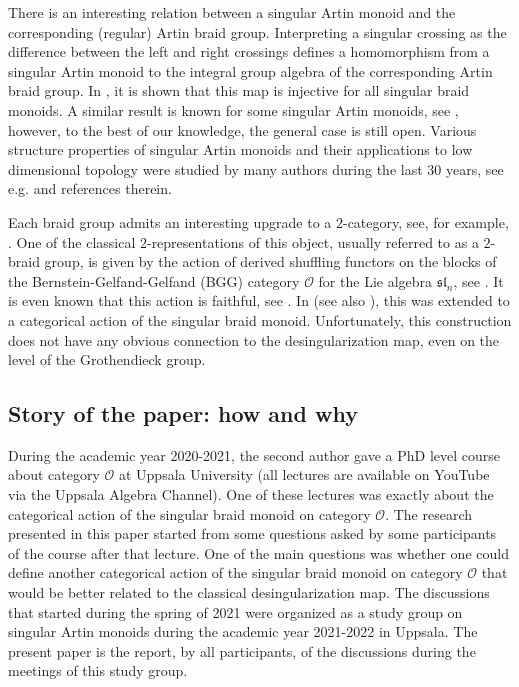 \documentclass[a4paper]{amsart}
\begin{document}
There is an interesting relation between a singular Artin monoid
and the corresponding (regular) Artin braid group.
Interpreting a singular crossing as the difference between 
the left and right crossings defines a homomorphism from a singular
Artin monoid to the integral group algebra of the corresponding Artin
braid group. In \cite{Pa04}, it is shown that this map is 
injective for all singular braid monoids. A similar result is known
for some singular Artin monoids, see \cite{GP05,Ea06}, however,
to the best of our knowledge, the general case is still open.
Various structure properties of singular Artin monoids
and their applications to low dimensional topology were studied
by many authors during the last 30 years, see e.g. 
\cite{An04,An05,Ba92,Bi93,Co00,Co05,Ea06,Ea15,GP05,Ja17,Pa04,Ve10} 
and references therein.

Each braid group admits an interesting upgrade to a $2$-category, see,
for example, \cite{Ro06}. One of the classical $2$-representations of
this object, usually referred to as a $2$-braid group, 
is given by the action of derived shuffling functors on the 
blocks of the Bernstein-Gelfand-Gelfand (BGG) category $\mathcal{O}$
for the Lie algebra $\mathfrak{sl}_n$, see \cite{MaStr}.
It is even known that this action is faithful, see \cite{KS02}.
In \cite[Theorem~1]{MaStr2} (see also \cite[Theorem~5.1]{CM}), 
this was extended to a categorical action of the singular braid monoid.
Unfortunately, this construction does not have any obvious connection
to the desingularization map, even on the level of the Grothendieck group.

\subsection{Story of the paper: how and why}\label{s1.2}

During the academic year 2020-2021, the second author gave a PhD level
course about category $\mathcal{O}$ at Uppsala University
(all lectures are available on YouTube via the Uppsala Algebra Channel).
One of these lectures was exactly about the categorical action of the
singular braid monoid on category $\mathcal{O}$. The research presented
in this paper started from some questions asked by some participants
of the course after that lecture. One of the main questions was whether
one could define another categorical action of the singular braid monoid
on category $\mathcal{O}$ that would be better related to the classical
desingularization map. The discussions that started during the spring of 
2021 were organized as a study group on singular Artin monoids during 
the academic year 2021-2022 in Uppsala. The present paper is the report, 
by all participants, of the discussions during the meetings of this 
study group. 
\end{document}
